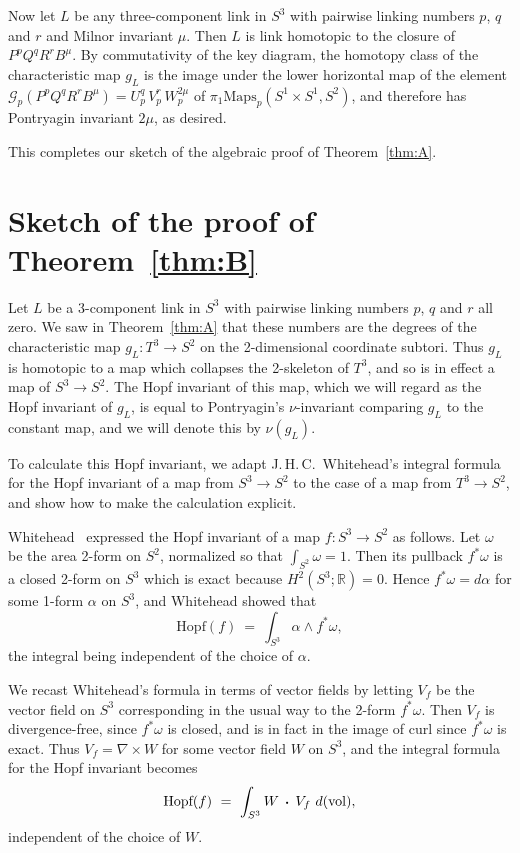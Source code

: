 \documentclass[11pt]{amsart}
\theoremstyle{definition}
\newcommand{\thmref}[1]{Theorem~\ref{#1}}
\def\br{\mathbb R}
\def\calg{\mathcal G}
\def\Mp{\text{Maps}_p(S^1\times S^1,S^2)}
\def\dt{\,\raisebox{.2ex}{\text{\tiny\textbullet}}\,}
\def\dtw{\,\dt\,}
\begin{document}
Now let $L$ be any three-component link in $S^3$ with pairwise linking numbers $p$, $q$ and $r$ and Milnor invariant $\mu$.  Then $L$ is link homotopic to the closure of  $P^p Q^q R^r B^\mu$.  By commutativity of the key diagram, the homotopy class of the characteristic map $g_L$ is the image under the lower horizontal map of the element $\calg_p(P^p Q^q R^r B^\mu) = U_p^q \, V_p^r \, W_p^{2\mu}$  of $\pi_1\Mp$,  and therefore has 
Pontryagin invariant $2 \mu$, as desired.

This completes our sketch of the algebraic proof of \thmref{thm:A}.
\pagebreak


\section{Sketch of the proof of Theorem~\ref{thm:B}}\label{sec:thmB}
Let $L$ be a 3-component link in $S^3$ with pairwise linking numbers $p$, $q$ and $r$ all zero.  We saw in Theorem~\ref{thm:A} that these numbers are the degrees of the characteristic map $g_L: T^3 \to S^2$ on the 2-dimensional coordinate subtori.  Thus $g_L$ is homotopic to a map which collapses the 2-skeleton of $T^3$, and so is in effect a map of $S^3 \to S^2$.  The Hopf invariant of this map, which we will regard as the Hopf invariant of $g_L$, is equal to Pontryagin's $\nu$-invariant comparing $g_L$ to the constant map, and we will denote this by $\nu(g_L)$.

To calculate this Hopf invariant, we adapt J.\,H.\,C.~Whitehead's integral formula for the Hopf invariant of a map from $S^3 \to S^2$ to the case of a map from $T^3 \to S^2$, and show how to make the calculation explicit.

Whitehead~\cite{Whitehead} expressed the Hopf invariant of a map $f: S^3 \to S^2$ as follows.  Let $\omega$ be the area 2-form on $S^2$, normalized so that $\int_{S^2} \omega = 1$.  Then its pullback $f^* \omega$ is a closed 2-form on $S^3$ which is exact because $H^2(S^3; \br) = 0$.  Hence $f^*\omega = d\alpha$ for some 1-form $\alpha$ on $S^3$, and Whitehead showed that
\[
	\text{Hopf}(f) \ = \ \int_{S^3} \alpha \wedge f^*\omega,
\]
the integral being independent of the choice of $\alpha$.

We recast Whitehead's formula in terms of vector fields by letting $V_f$ be the vector field on $S^3$ corresponding in the usual way to the 2-form $f^* \omega$.  Then $V_f$ is divergence-free, since $f^* \omega$ is closed, and is in fact in the image of curl since $f^* \omega$ is exact.  Thus $V_f = \nabla \times W$ for some vector field $W$ on $S^3$, and the integral formula for the Hopf invariant becomes
$$
\text{Hopf}(f) \ = \ \int_{S^3} W \dtw V_f \ d(\text{vol}),
$$
independent of the choice of $W$.  
\end{document}
